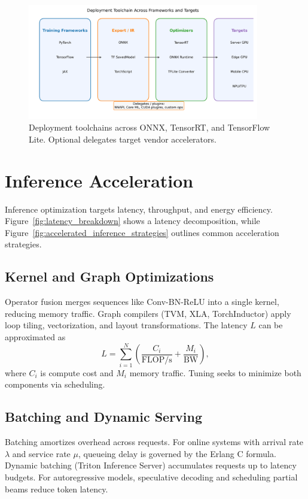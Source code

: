 \documentclass{article}
\begin{document}
\begin{figure}[H]
  \centering
  \includegraphics[width=0.9\textwidth]{deployment_toolchain.png}
  \caption{Deployment toolchains across ONNX, TensorRT, and TensorFlow Lite. Optional delegates target vendor accelerators.}
  \label{fig:deployment_toolchain}
\end{figure}
\FloatBarrier

\section{Inference Acceleration}
Inference optimization targets latency, throughput, and energy efficiency. Figure~\ref{fig:latency_breakdown} shows a latency decomposition, while Figure~\ref{fig:accelerated_inference_strategies} outlines common acceleration strategies.

\subsection{Kernel and Graph Optimizations}
Operator fusion merges sequences like Conv-BN-ReLU into a single kernel, reducing memory traffic. Graph compilers (TVM, XLA, TorchInductor) apply loop tiling, vectorization, and layout transformations. The latency $L$ can be approximated as
\begin{equation}
  L = \sum_{i=1}^{N} \left(\frac{C_i}{\mathrm{FLOP/s}} + \frac{M_i}{\mathrm{BW}}\right),
\end{equation}
where $C_i$ is compute cost and $M_i$ memory traffic. Tuning seeks to minimize both components via scheduling.

\subsection{Batching and Dynamic Serving}
Batching amortizes overhead across requests. For online systems with arrival rate $\lambda$ and service rate $\mu$, queueing delay is governed by the Erlang C formula. Dynamic batching (Triton Inference Server) accumulates requests up to latency budgets. For autoregressive models, speculative decoding and scheduling partial beams reduce token latency.
\end{document}
